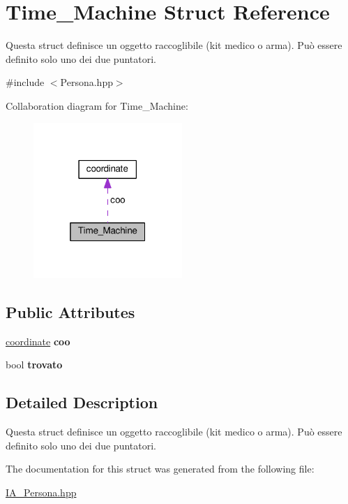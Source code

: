 \hypertarget{structTime__Machine}{}\section{Time\+\_\+\+Machine Struct Reference}
\label{structTime__Machine}


Questa struct definisce un oggetto raccoglibile (kit medico o arma). Può essere definito solo uno dei due puntatori.  




{\ttfamily \#include $<$Persona.\+hpp$>$}



Collaboration diagram for Time\+\_\+\+Machine\+:\nopagebreak
\begin{figure}[H]
\begin{center}
\leavevmode
\includegraphics[width=160pt]{structTime__Machine__coll__graph}
\end{center}
\end{figure}
\subsection*{Public Attributes}
\begin{DoxyCompactItemize}
\item 
\hypertarget{structTime__Machine_a3493421879269b494d0c622ab362864d}{}\hyperlink{structcoordinate}{coordinate} {\bfseries coo}\label{structTime__Machine_a3493421879269b494d0c622ab362864d}

\item 
\hypertarget{structTime__Machine_a7758931499204635bc529bf0411f74bc}{}bool {\bfseries trovato}\label{structTime__Machine_a7758931499204635bc529bf0411f74bc}

\end{DoxyCompactItemize}


\subsection{Detailed Description}
Questa struct definisce un oggetto raccoglibile (kit medico o arma). Può essere definito solo uno dei due puntatori. 

The documentation for this struct was generated from the following file\+:\begin{DoxyCompactItemize}
\item 
\hyperlink{IA__Persona_8hpp}{I\+A\+\_\+\+Persona.\+hpp}\end{DoxyCompactItemize}
